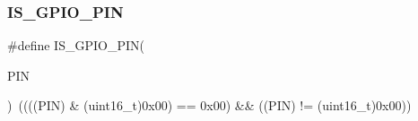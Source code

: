 \subsubsection{\texorpdfstring{IS\_GPIO\_PIN}{IS\_GPIO\_PIN}}
{\footnotesize\ttfamily \#define I\+S\+\_\+\+G\+P\+I\+O\+\_\+\+P\+IN(\begin{DoxyParamCaption}\item[{}]{P\+IN }\end{DoxyParamCaption})~((((P\+IN) \& (uint16\+\_\+t)0x00) == 0x00) \&\& ((\+P\+I\+N) != (uint16\+\_\+t)0x00))}

